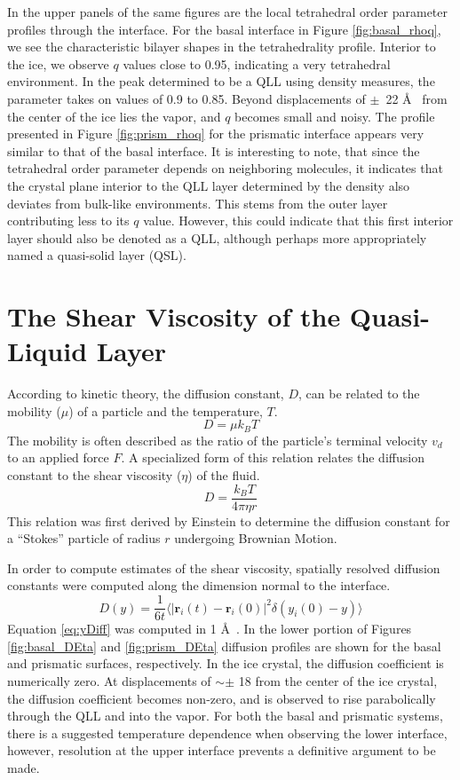 In the upper panels of the same figures are the local tetrahedral
order parameter profiles through the interface. For the basal
interface in Figure \ref{fig:basal_rhoq}, we see the characteristic
bilayer shapes in the tetrahedrality profile. Interior to the ice, we
observe $q$ values close to 0.95, indicating a very tetrahedral
environment. In the peak determined to be a QLL using density
measures, the parameter takes on values of 0.9 to 0.85. Beyond
displacements of $\pm$~22 \AA~ from the center of the ice lies the
vapor, and $q$ becomes small and noisy. The profile presented in
Figure \ref{fig:prism_rhoq} for the prismatic interface appears very
similar to that of the basal interface. It is interesting to note, that since
the tetrahedral order parameter depends on neighboring molecules, it
indicates that the crystal plane interior to the QLL layer determined
by the density also deviates from bulk-like environments. This stems
from the outer layer contributing less to its $q$ value. However,
this could indicate that this first interior layer should also be
denoted as a QLL, although perhaps more appropriately named a
quasi-solid layer (QSL).



\section{The Shear Viscosity of the Quasi-Liquid Layer}
According to kinetic theory, the diffusion constant, $D$, can be
related to the mobility ($\mu$) of a particle and the temperature,
$T$.
\begin{equation}
D = \mu k_B T
\end{equation}
The mobility is often described as the ratio of the particle's
terminal velocity $v_d$ to an applied force $F$. A specialized form of
this relation relates the diffusion constant to the shear viscosity
($\eta$) of the fluid.
\begin{equation}\label{eq:stokes-einst}
D = \frac{k_BT}{4\pi \eta r}
\end{equation}
This relation was first derived by Einstein to determine the diffusion
constant for a ``Stokes'' particle of radius $r$ undergoing Brownian
Motion.

In order to compute estimates of the shear viscosity, spatially
resolved diffusion constants were computed along the dimension normal
to the interface.
\begin{equation}\label{eq:yDiff}
D(y) = \frac{1}{6t} \langle | \mathbf{r}_i(t) - \mathbf{r}_i(0) |^2
\delta(y_i(0) - y)  \rangle 
\end{equation}
Equation \eqref{eq:yDiff} was computed in 1 \AA~. In the lower portion
of Figures \ref{fig:basal_DEta} and \ref{fig:prism_DEta} diffusion
profiles are shown for the basal and prismatic surfaces,
respectively. In the ice crystal, the diffusion coefficient is
numerically zero. At displacements of $\sim \pm$ 18 from the center of
the ice crystal, the diffusion coefficient becomes non-zero, and is
observed to rise parabolically through the QLL and into the vapor. For
both the basal and prismatic systems, there is a suggested temperature
dependence when observing the lower interface, however, resolution at
the upper interface prevents a definitive argument to be made.


